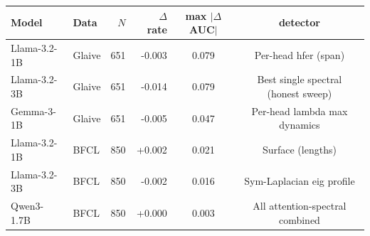 \begin{tabular}{llrrcc}
\toprule
Model & Data & $N$ & $\Delta$ rate & max $|\Delta$AUC$|$ & detector \\
\midrule
Llama-3.2-1B & Glaive & 651 & -0.003 & 0.079 & Per-head hfer (span) \\
Llama-3.2-3B & Glaive & 651 & -0.014 & 0.079 & Best single spectral (honest sweep) \\
Gemma-3-1B & Glaive & 651 & -0.005 & 0.047 & Per-head lambda max dynamics \\
Llama-3.2-1B & BFCL & 850 & +0.002 & 0.021 & Surface (lengths) \\
Llama-3.2-3B & BFCL & 850 & -0.002 & 0.016 & Sym-Laplacian eig profile \\
Qwen3-1.7B & BFCL & 850 & +0.000 & 0.003 & All attention-spectral combined \\
\bottomrule
\end{tabular}
